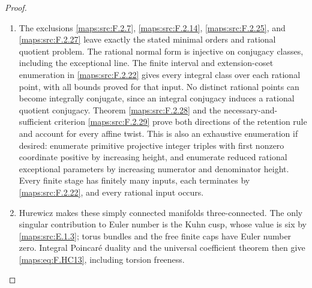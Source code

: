 \documentclass[11pt,a4paper]{article}
\numberwithin{equation}{section}
\theoremstyle{definition}
\begin{document}
\begin{proof}
\begin{enumerate}[label=\arabic*.]
\item The exclusions \ref{maps:src:F.2.7}, \ref{maps:src:F.2.14}, \ref{maps:src:F.2.25}, and \ref{maps:src:F.2.27}
leave exactly the stated minimal orders and rational
quotient problem.
The rational normal form is injective on conjugacy
classes, including the exceptional line.
The finite interval and extension-coset enumeration
in \ref{maps:src:F.2.22} gives every integral class over each rational
point, with all bounds proved for that input.
No distinct rational points can become integrally
conjugate, since an integral conjugacy induces a
rational quotient conjugacy.
Theorem \ref{maps:src:F.2.28} and the necessary-and-sufficient
criterion \ref{maps:src:F.2.29} prove both directions of the
retention rule and account for every affine twist.
This is also an exhaustive enumeration if desired:
enumerate primitive projective integer triples with
first nonzero coordinate positive by increasing height,
and enumerate reduced rational exceptional parameters
by increasing numerator and denominator height.
Every finite stage has finitely many inputs, each
terminates by \ref{maps:src:F.2.22}, and every rational input occurs.


\item Hurewicz makes these simply connected manifolds three-connected.  The only singular contribution to
Euler number is the Kuhn cusp, whose value is six
by \cref{maps:src:E.1.3}; torus bundles and the free finite caps have
Euler number zero.
Integral Poincar\'e duality and the universal coefficient
theorem then give \eqref{maps:eq:F.HC13}, including torsion freeness.


\end{enumerate}
\end{proof}
\end{document}
